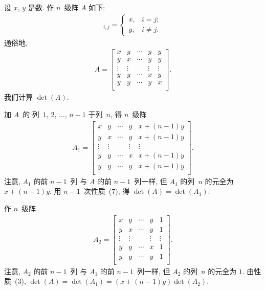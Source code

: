 \documentclass[../libro.tex]{subfiles}
\begin{document}
\begin{example}
    设 \(x\), \(y\) 是数.
    作 \(n\)~级阵 \(A\) 如下:
    \begin{align*}
        [A]_{i,j} =
        \begin{cases}
            x, & i = j;    \\
            y, & i \neq j.
        \end{cases}
    \end{align*}
    通俗地,
    \begin{align*}
        A =
        \begin{bmatrix}
            x      & y      & \cdots & y      & y      \\
            y      & x      & \cdots & y      & y      \\
            \vdots & \vdots & {}     & \vdots & \vdots \\
            y      & y      & \cdots & x      & y      \\
            y      & y      & \cdots & y      & x      \\
        \end{bmatrix}.
    \end{align*}
    我们计算 \(\det {(A)}\).

    加 \(A\)~的%
    列~\(1\), \(2\), \(\dots\), \(n-1\) 于列~\(n\),
    得 \(n\)~级阵
    \begin{align*}
        A_1 =
        \begin{bmatrix}
            x      & y      & \cdots & y      & x + (n-1)y \\
            y      & x      & \cdots & y      & x + (n-1)y \\
            \vdots & \vdots & {}     & \vdots & \vdots     \\
            y      & y      & \cdots & x      & x + (n-1)y \\
            y      & y      & \cdots & y      & x + (n-1)y \\
        \end{bmatrix}.
    \end{align*}
    注意, \(A_1\) 的前 \(n-1\)~列%
    与 \(A\) 的前 \(n-1\)~列一样,
    但 \(A_1\) 的列~\(n\) 的元全为 \(x + (n-1)y\).
    用 \(n-1\)~次性质~(7), 得
    \(\det {(A)} = \det {(A_1)}\).

    作 \(n\)~级阵
    \begin{align*}
        A_2 =
        \begin{bmatrix}
            x      & y      & \cdots & y      & 1      \\
            y      & x      & \cdots & y      & 1      \\
            \vdots & \vdots & {}     & \vdots & \vdots \\
            y      & y      & \cdots & x      & 1      \\
            y      & y      & \cdots & y      & 1      \\
        \end{bmatrix}.
    \end{align*}
    注意, \(A_2\) 的前 \(n-1\)~列%
    与 \(A_1\) 的前 \(n-1\)~列一样,
    但 \(A_2\) 的列~\(n\) 的元全为 \(1\).
    由性质~(3),
    \(\det {(A)} = \det {(A_1)}
    = (x + (n-1)y) \det {(A_2)}\).


\end{example}
\end{document}
